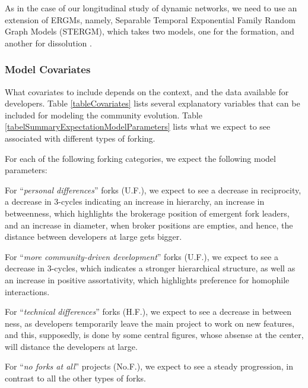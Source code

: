 \documentclass{acm_proc_article-sp}
\begin{document}
As in the case of our longitudinal study of dynamic networks, we need to use an extension of ERGMs, namely, Separable Temporal Exponential Family Random Graph Models (STERGM), which takes two models, one for the formation, and another for dissolution \cite{Krivitsky}.

\subsubsection{Model Covariates}
What covariates to include depends on the context, and the data available for developers.
Table \ref{tableCovariates} lists several explanatory variables that can be included for modeling the community evolution. Table \ref{tabelSummaryExpectationModelParameters} lists what we expect to see associated with different types of forking.

For each of the following forking categories, we expect the following model parameters:

For ``\textit{personal differences}'' forks (U.F.), we expect to see a decrease in reciprocity, a decrease in 3-cycles indicating an increase in hierarchy, an increase in betweenness, which highlights the brokerage position of emergent fork leaders, and an increase in diameter, when broker positions are empties, and hence, the distance between developers at large gets bigger. 

For ``\textit{more community-driven development}'' forks (U.F.), we expect to see a decrease in 3-cycles, which indicates a stronger hierarchical structure, as well as an increase in positive assortativity, which highlights preference for homophile interactions.

For  ``\textit{technical differences}'' forks (H.F.), we expect to see a decrease in between ness, as developers temporarily leave the main project to work on new features, and this, supposedly, is done by some central figures, whose absense at the center, will distance the developers at large.

For ``\textit{no forks at all}'' projects (No.F.), we expect to see a steady progression, in contrast to all the other types of forks.
\end{document}
